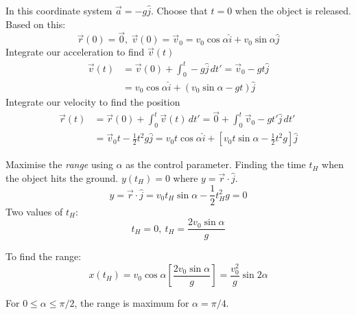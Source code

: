 \documentclass[10pt]{scrartcl}
\begin{document}
\begin{example}[Projectile]
\begin{center}
\begin{tikzpicture}
\end{tikzpicture}
	\end{center}
	
	In this coordinate system $\vec{a} = -g\hat{j}$. Choose that $t = 0$ when the object is released. Based on this: \[\vec{r}(0) = \vec{0},~\vec{v}(0) = \vec{v}_0 = v_0\cos\alpha\hat{i} + v_0\sin\alpha\hat{j}\]
	Integrate our acceleration to find $\vec{v}(t)$
	\[\begin{aligned}\vec{v}(t) &= \vec{v}(0) + \int_0^t -g\hat{j}\,dt' = \vec{v}_0 -gt\hat{j} \\ 
	&= v_0\cos\alpha\hat{i} + (v_0\sin\alpha -gt)\hat{j}
\end{aligned}
\]
	Integrate our velocity to find the position
	\[\begin{aligned}
\vec{r}(t) &= \vec{r}(0) + 	\int_0^t \vec{v}(t)\,dt' = \vec{0} + \int_0^t\vec{v}_0 -gt'\hat{j}\,dt'\\
&= \vec{v}_0t - \textstyle{\frac{1}{2}}t^2g\hat{j} = v_0t\cos\alpha\hat{i} + [v_0t\sin\alpha - \textstyle{\frac{1}{2}}t^2g]\hat{j}
\end{aligned}
\]

Maximise the \emph{range} using $\alpha$ as the control parameter. Finding the time $t_H$ when the object hits the ground. $y(t_H) = 0$ where $y = \vec{r}\cdot\hat{j}$. 
\[y = \vec{r}\cdot\hat{j}= v_0t_H\sin\alpha -\textstyle{\frac{1}{2}}t_H^2g = 0\]
Two values of $t_H$:
\[t_H = 0,~ t_H = \frac{2v_0\sin\alpha}{g}\]

To find the range:
\[x(t_H) = v_0\cos\alpha\left[\frac{2v_0\sin\alpha}{g}\right] = \frac{v_0^2}{g}\sin 2\alpha\]

For $0 \leq \alpha \leq \pi/2$, the range is maximum for $\alpha = \pi/4$.
\end{example}~\\
\end{document}

